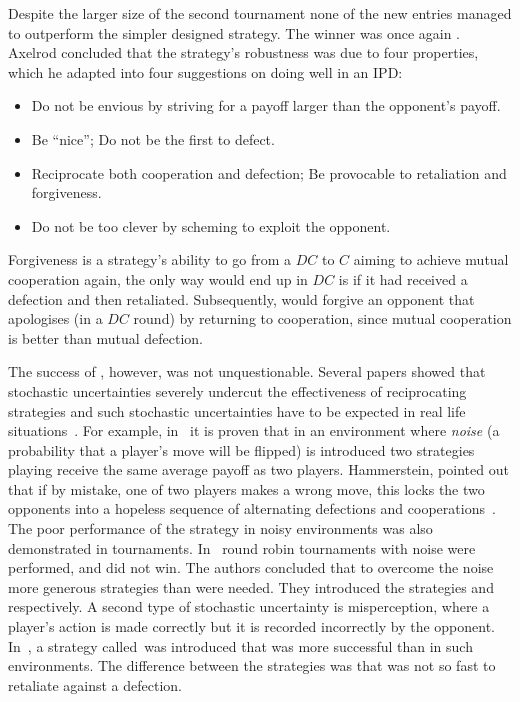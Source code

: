 Despite the larger size of the second tournament none of the new entries managed
to outperform the simpler designed strategy. The winner was once again \TitForTat.
Axelrod concluded that the strategy's
robustness was due to four properties, which he adapted into four suggestions on
doing well in an IPD:

\begin{itemize}
    \item Do not be envious by striving for a payoff larger than the opponent's payoff.
    \item Be ``nice''; Do not be the first to defect.
    \item Reciprocate both cooperation and defection; Be provocable to retaliation and forgiveness.
    \item Do not be too clever by scheming to exploit the opponent.
\end{itemize}

Forgiveness is a strategy's ability to go from a \(DC\) to \(C\) aiming to achieve
mutual cooperation again, the only way \TitForTat would end up in \(DC\)
is if it had received a defection and then
retaliated. Subsequently, \TitForTat would forgive an opponent that apologises
(in a \(DC\) round) by returning to cooperation, since mutual cooperation is
better than mutual defection.

The success of \TitForTat, however, was not unquestionable. Several papers
showed that stochastic uncertainties severely undercut the effectiveness of
reciprocating strategies and such stochastic uncertainties have to be expected
in real life situations~\cite{Milinski1987}. For example, in~\cite{Molander1985}
it is
proven that in an environment where \textit{noise} (a probability that a
player's move will be flipped) is introduced two strategies playing \TitForTat
receive the same average payoff as two \Random players.
Hammerstein, pointed out that if by mistake, one of two
\TitForTat players makes a wrong move, this locks the two opponents into a
hopeless sequence of alternating defections and cooperations~\cite{Hammerstein1984}.
The poor performance of the strategy in noisy environments was also demonstrated
in tournaments. In~\cite{Bendor1991, Donninger1986} round robin
tournaments with noise were performed, and \TitForTat did not win.
The authors concluded that to overcome the noise more generous strategies
than \TitForTat were needed. They introduced the strategies \NiceandForgiving
and \OmegaTFT respectively.
A second type of stochastic uncertainty is
misperception, where a player's action is made correctly but it is recorded
incorrectly by the opponent. In~\cite{Wu1995}, a strategy
called~\ContriteTitForTat was introduced that was more successful than \TitForTat
in such environments. The difference between the strategies was that
\ContriteTitForTat was not so fast to retaliate against a defection.

